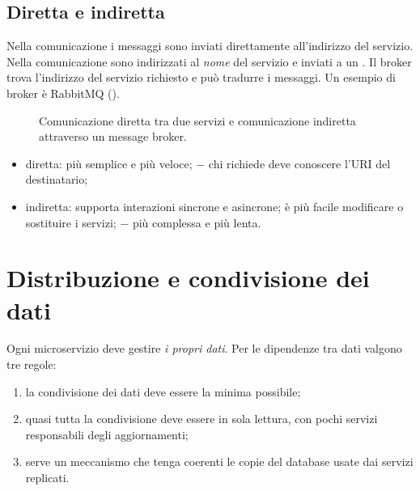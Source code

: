 \subsection{Diretta e indiretta}

Nella comunicazione  i messaggi sono inviati direttamente all'indirizzo del servizio. Nella
comunicazione  sono indirizzati al \emph{nome} del servizio e inviati a un .
Il broker trova l'indirizzo del servizio richiesto e può tradurre i messaggi. Un esempio di broker è RabbitMQ
().

\begin{figure}[ht]
\centering
{}
\caption{Comunicazione diretta tra due servizi e comunicazione indiretta attraverso un message broker.}
\label{fig:micro-broker}
\end{figure}

\begin{itemize}
  \item[$+$] diretta: più semplice e più veloce; $-$ chi richiede deve conoscere l'URI del destinatario;
  \item[$+$] indiretta: supporta interazioni sincrone e asincrone; è più facile modificare o sostituire i servizi;
    $-$ più complessa e più lenta.
\end{itemize}

\section{Distribuzione e condivisione dei dati}
\label{sec:micro-dati}

Ogni microservizio deve gestire \emph{i propri dati}. Per le dipendenze tra dati valgono tre regole:
\begin{enumerate}
  \item la condivisione dei dati deve essere la minima possibile;
  \item quasi tutta la condivisione deve essere in sola lettura, con pochi servizi responsabili degli aggiornamenti;
  \item serve un meccanismo che tenga coerenti le copie del database usate dai servizi replicati.
\end{enumerate}

